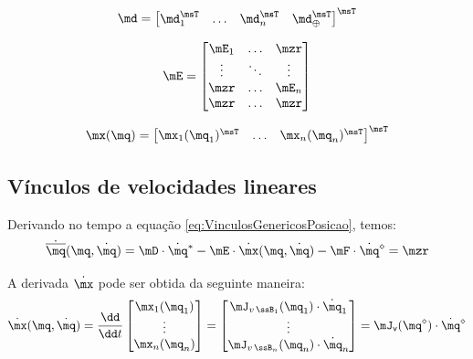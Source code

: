 \documentclass[]{politex}
\begin{document}

\begin{equation}
\md  = \begin{bmatrix}
\md_1^\msT &
\hdots &
\md_n^\msT &
\md_{\oplus}^\msT
\end{bmatrix}^\msT
\end{equation}

\begin{equation}
\mE = \begin{bmatrix}
\mE_1 & \ldots & \mzr\\
\vdots & \ddots & \vdots\\
\mzr &\ldots  & \mE_{n} \\
\mzr &\ldots  & \mzr
\end{bmatrix}
\end{equation}

\begin{equation}
\mx(\mq) = 
\begin{bmatrix}
\mx_1(\mq_1)^\msT &
\hdots &
\mx_n(\mq_n)^\msT
\end{bmatrix}^\msT
\end{equation}

\subsection{Vínculos de velocidades lineares} \label{S05-03-02-02}

Derivando no tempo a equação \eqref{eq:VinculosGenericosPosicao}, temos:
\begin{equation} \label{eq:VinculosGenericosVel}
\dot{\overline{\mq}}(\mq,\dot{\mq}) = \mD \cdot \dot{\mq}^\ast - \mE \cdot \dot{\mx}(\mq,\dot{\mq}) - \mF \cdot \dot{\mq}^\diamond = \mzr
\end{equation}


A derivada $\dot{\mx}$ pode ser obtida da seguinte maneira:
\begin{equation} \label{eq:dxdt}
\dot{\mx}(\mq,\dot{\mq}) = \frac{\dd}{\dd t}
\begin{bmatrix}
\mx_1(\mq_1) \\
\vdots \\
\mx_n(\mq_n)
\end{bmatrix} =
\begin{bmatrix}
\mJ_{v\,\ssB_1}(\mq_1) \cdot \dot{\mq}_1 \\
\vdots \\
\mJ_{v\,\ssB_n}(\mq_n) \cdot \dot{\mq}_n
\end{bmatrix}
=
\mJ_{\mathsf{v}}(\mq^\diamond) \cdot \dot{\mq}^\diamond
\end{equation}
\end{document}
